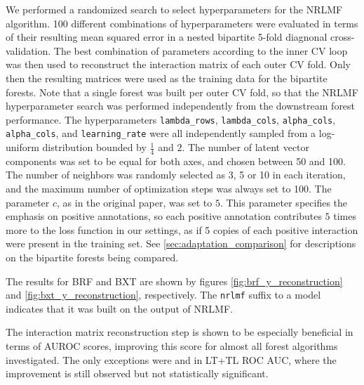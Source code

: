 We performed a randomized search to select hyperparameters for the NRLMF algorithm. 100 different combinations of hyperparameters were evaluated
in terms of their resulting mean squared error in a nested bipartite 5-fold diagnonal cross-validation.
The best combination of parameters according to the inner CV loop was then used to reconstruct the interaction matrix of each outer CV fold. Only then the resulting matrices were used as the training data for the bipartite forests. Note that a single forest was built per outer CV fold, so that the NRLMF hyperparameter search was performed independently from the downstream forest performance. The hyperparameters \texttt{lambda\_rows}, \texttt{lambda\_cols}, \texttt{alpha\_cols}, \texttt{alpha\_cols}, and \texttt{learning\_rate} were all independently sampled from a log-uniform distribution bounded by $\frac{1}{4}$ and $2$. The number of latent vector components was set to be equal for both axes, and chosen between 50 and 100. The number of neighbors was randomly selected as 3, 5 or 10 in each iteration, and the maximum number of optimization steps was always set to 100. The parameter $c$, as in the original paper, was set to $5$. This parameter specifies the emphasis on positive annotations, so each positive annotation contributes $5$ times more to the loss function in our settings, as if 5 copies of each positive interaction were present in the training set.
%
See \autoref{sec:adaptation_comparison} for descriptions on the bipartite forests being compared.

The results for BRF and BXT are shown by figures \ref{fig:brf_y_reconstruction} and \ref{fig:bxt_y_reconstruction}, respectively. The \texttt{nrlmf} suffix to a model indicates that it was built on the output of NRLMF.

The interaction matrix reconstruction step is shown to be especially beneficial in terms of AUROC scores, improving this score for almost all forest algorithms investigated. The only exceptions were  and  in LT+TL ROC AUC, where the improvement is still observed but not statistically significant.
%
%

